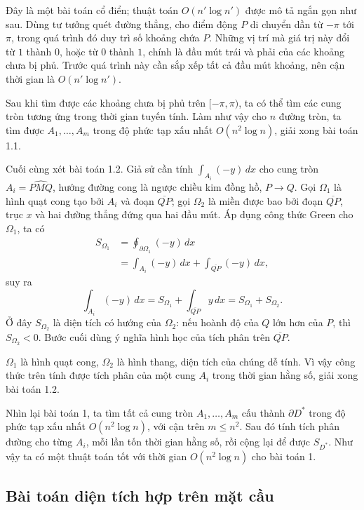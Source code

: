 \documentclass[11pt]{article}
\begin{document}
Đây là một bài toán cổ điển; thuật toán \(O(n'\log n')\) được mô tả ngắn gọn
như sau. Dùng tư tưởng quét đường thẳng, cho điểm động \(P\) di chuyển dần từ
\(-\pi\) tới \(\pi\), trong quá trình đó duy trì số khoảng chứa \(P\). Những vị
trí mà giá trị này đổi từ \(1\) thành \(0\), hoặc từ \(0\) thành \(1\), chính
là đầu mút trái và phải của các khoảng chưa bị phủ. Trước quá trình này cần sắp
xếp tất cả đầu mút khoảng, nên cận thời gian là \(O(n'\log n')\).

Sau khi tìm được các khoảng chưa bị phủ trên \([-\pi,\pi)\), ta có thể tìm các
cung tròn tương ứng trong thời gian tuyến tính. Làm như vậy cho \(n\) đường
tròn, ta tìm được \(A_1,\ldots,A_m\) trong độ phức tạp xấu nhất
\(O(n^2\log n)\), giải xong bài toán 1.1.

Cuối cùng xét bài toán 1.2. Giả sử cần tính \(\int_{A_i}(-y)\,dx\) cho cung
tròn \(A_i=\widehat{PMQ}\), hướng đường cong là ngược chiều kim đồng hồ,
\(P\to Q\). Gọi \(\Omega_1\) là hình quạt cong tạo bởi \(A_i\) và đoạn
\(\overline{QP}\); gọi \(\Omega_2\) là miền được bao bởi đoạn \(\overline{QP}\),
trục \(x\) và hai đường thẳng đứng qua hai đầu mút. Áp dụng công thức Green cho
\(\Omega_1\), ta có
\[
\begin{aligned}
  S_{\Omega_1}
  &=\oint_{\partial\Omega_1}(-y)\,dx\\
  &=\int_{A_i}(-y)\,dx+\int_{\overline{QP}}(-y)\,dx,
\end{aligned}
\]
suy ra
\[
  \int_{A_i}(-y)\,dx
  =S_{\Omega_1}+\int_{\overline{QP}} y\,dx
  =S_{\Omega_1}+S_{\Omega_2}.
\]
Ở đây \(S_{\Omega_2}\) là diện tích có hướng của \(\Omega_2\): nếu hoành độ của
\(Q\) lớn hơn của \(P\), thì \(S_{\Omega_2}<0\). Bước cuối dùng ý nghĩa hình
học của tích phân trên \(\overline{QP}\).

\(\Omega_1\) là hình quạt cong, \(\Omega_2\) là hình thang, diện tích của chúng
dễ tính. Vì vậy công thức trên tính được tích phân của một cung \(A_i\) trong
thời gian hằng số, giải xong bài toán 1.2.

Nhìn lại bài toán 1, ta tìm tất cả cung tròn \(A_1,\ldots,A_m\) cấu thành
\(\partial D^*\) trong độ phức tạp xấu nhất \(O(n^2\log n)\), với cận trên
\(m\le n^2\). Sau đó tính tích phân đường cho từng \(A_i\), mỗi lần tốn thời
gian hằng số, rồi cộng lại để được \(S_{D^*}\). Như vậy ta có một thuật toán
tốt với thời gian \(O(n^2\log n)\) cho bài toán 1.

\subsection{Bài toán diện tích hợp trên mặt cầu}
\end{document}
